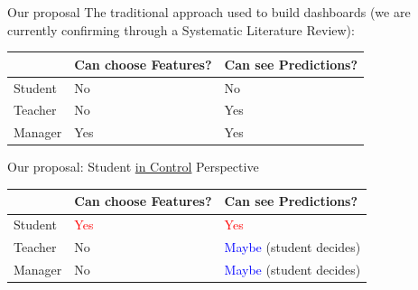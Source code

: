 \begin{frame}{Our proposal}
    The traditional approach used to build dashboards (we are currently confirming through a Systematic Literature Review):

    \begin{table}[]
        \begin{tabular}{|l|l|l|} \hline
                 & Can choose Features? & Can see Predictions?\\ \hline
         Student & No                   & No                  \\ \hline
         Teacher & No                   & Yes                 \\ \hline
         Manager & Yes                  & Yes                 \\ \hline
        \end{tabular}
    \end{table}

    \pause
    Our proposal: Student \underline{in Control} Perspective
    \pause
    \begin{table}[]
        \begin{tabular}{|l|l|l|} \hline
                 & Can choose Features?  & Can see Predictions?                    \\ \hline
         Student & \textcolor{red}{Yes}  & \textcolor{red}{Yes}                    \\ \hline
         Teacher & No                    & \textcolor{blue}{Maybe} (student decides) \\ \hline
         Manager & No                    & \textcolor{blue}{Maybe} (student decides) \\ \hline
        \end{tabular}
    \end{table}

\end{frame}

